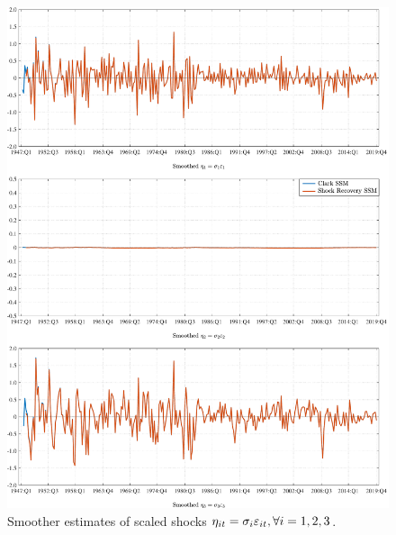 \documentclass[a4paper,final,12pt]{article}
\begin{document}
\begin{figure}[p!]
\centering
\includegraphics[angle=00, width=1\textwidth,trim={0 0 0
0},clip]{Clark_SSM_Smoothed.pdf} \vspace*{-2.5mm}
\caption{Smoother estimates of scaled shocks $\protect\eta_{it} = \protect%
\sigma_i\protect\varepsilon_{it}, \forall i=1,2,3$.}
\label{fig:KS}
\end{figure}
\end{document}
